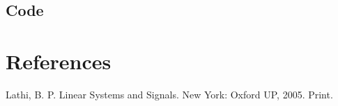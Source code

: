 \documentclass{article}
\begin{document}
\subsection{Code}

\section{References}

Lathi, B. P. Linear Systems and Signals. New York: Oxford UP, 2005. Print.
\end{document}
